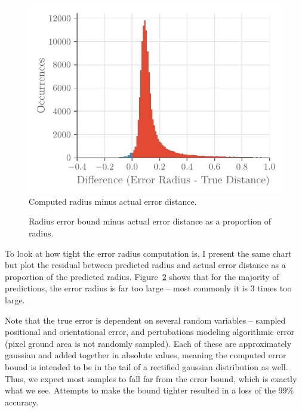 \documentclass[a4paper,12pt,twoside,openright]{report}
\begin{document}
\begin{figure}[htb]
    \begin{center}
        \includegraphics{figures/camera/diff_radius_true_error.pdf}
    \end{center}
    \caption[Bound Minus True Distance]{Computed radius minus actual error distance.}
    \label{fig:camera:diff bound error}
\end{figure}

\begin{figure}[htb]
    \begin{center}
        
    \end{center}
    \caption[Bound Minus True Distance as a Proportion]{Radius error bound minus actual error distance as a proportion of radius.}
    \label{fig:camera:proportional diff}
\end{figure}

To look at how tight the error radius computation is, I present the same chart
but plot the residual between predicted radius and actual error distance as a 
proportion of the predicted radius. Figure~\ref{fig:camera:proportional diff} shows that for the majority
of predictions, the error radius is far too large -- most commonly it is 3 times 
too large. 

Note that the true error is dependent on several random variables -- sampled positional and orientational
error, and pertubations modeling algorithmic error (pixel ground area is not randomly sampled). Each
of these are approximately gaussian and added together in absolute values, meaning the computed error bound is intended to be in the tail
of a rectified gaussian distribution as well. Thus, we expect most samples to
fall far from the error bound, which is exactly what we see.
Attempts to make the bound tighter resulted in a loss of the 99\% accuracy.
\end{document}
